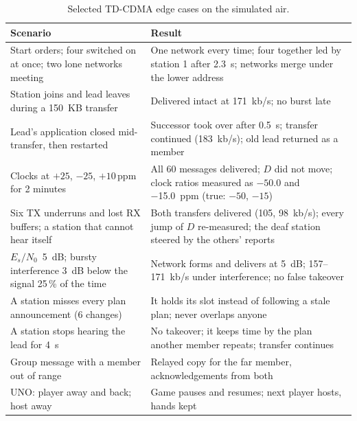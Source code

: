\documentclass[11pt,a4paper,oneside]{report}
\newcommand{\EsNo}{\ensuremath{E_s/N_0}}
\begin{document}
\begin{table}[htbp]
\centering\small
\caption{Selected TD-CDMA edge cases on the simulated air.}\label{tab:edge}
\begin{tabularx}{\linewidth}{@{}>{\raggedright\arraybackslash}p{50mm}L@{}}
\toprule
\textbf{Scenario} & \textbf{Result}\\
\midrule
Start orders; four switched on at once; two lone networks meeting & One network every time; four together led by station 1 after \SI{2.3}{s}; networks merge under the lower address\\
Station joins and lead leaves during a \SI{150}{KB} transfer & Delivered intact at \SI{171}{kb/s}; no burst late\\
Lead's application closed mid-transfer, then restarted & Successor took over after \SI{0.5}{s}; transfer continued (\SI{183}{kb/s}); old lead returned as a member\\
Clocks at $+25$, $-25$, $+10$\,ppm for 2 minutes & All 60 messages delivered; $D$ did not move; clock ratios measured as $-50.0$ and \SI{-15.0}{ppm} (true: $-50$, $-15$)\\
Six TX underruns and lost RX buffers; a station that cannot hear itself & Both transfers delivered (105, \SI{98}{kb/s}); every jump of $D$ re-measured; the deaf station steered by the others' reports\\
\EsNo\ \SI{5}{dB}; bursty interference \SI{3}{dB} below the signal 25\,\% of the time & Network forms and delivers at \SI{5}{dB}; 157--\SI{171}{kb/s} under interference; no false takeover\\
A station misses every plan announcement (6 changes) & It holds its slot instead of following a stale plan; never overlaps anyone\\
A station stops hearing the lead for \SI{4}{s} & No takeover; it keeps time by the plan another member repeats; transfer continues\\
Group message with a member out of range & Relayed copy for the far member, acknowledgements from both\\
UNO: player away and back; host away & Game pauses and resumes; next player hosts, hands kept\\
\bottomrule
\end{tabularx}
\end{table}
\end{document}
